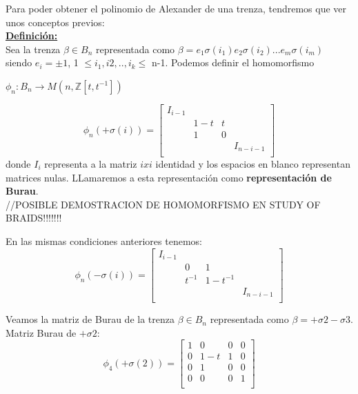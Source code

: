 \documentclass[14pt]{extarticle}
\begin{document}
Para poder obtener el polinomio de Alexander de una trenza, tendremos que ver unos conceptos previos:\\

\textbf{\underline{Definición:}}\\
Sea la trenza $\beta \in B_{n}$ representada como $\beta = e_{1} \sigma(i_{1}) e_{2} \sigma(i_{2}) ... e_{m} \sigma(i_{m}) $ siendo $e_{i} = \pm 1$, 1 $\le i_{1}, i{2},..,i_{k} \le$ n-1. Podemos definir el homomorfismo
\begin{center}
	 $ \phi_{n} : B_{n}  \rightarrow  M(n,\mathds{Z}[t,t^{-1}])$	 
\end{center}
\[ \phi_{n} ( +\sigma (i)) = \begin{bmatrix}
I_{i-1} &  &  & \\
 & 1-t & t &  \\
 & 1 & 0 &  \\
 &  &  & I_{n-i-1} \\
\end{bmatrix}\]
donde $ I_{i} $ representa a la matriz $ ixi $ identidad y los espacios en blanco representan matrices nulas. LLamaremos a esta representación como \textbf{representación de Burau}.\\
//POSIBLE DEMOSTRACION DE HOMOMORFISMO EN STUDY OF BRAIDS!!!!!!!\\

\begin{pro}
	En las mismas condiciones anteriores tenemos:\\
	\[ \phi_{n} ( -\sigma (i)) = \begin{bmatrix}
	I_{i-1} &  &  & \\
	& 0 & 1 &  \\
	& t^{-1} & 1-t^{-1} &  \\	
	&  &  & I_{n-i-1} \\
	\end{bmatrix}\]
\end{pro}

Veamos la matriz de Burau de la trenza $\beta \in B_{n}$ representada como $\beta = +\sigma2-\sigma3$.\\
Matriz Burau de $ +\sigma2 $:
	\[ \phi_{4} ( +\sigma (2)) = \begin{bmatrix}
	1 & 0 & 0 & 0 \\
	0 & 1-t & 1 & 0  \\
	0 & 1 & 0 & 0 \\
	0 & 0 & 0 & 1 \\
	\end{bmatrix}\]
\end{document}
